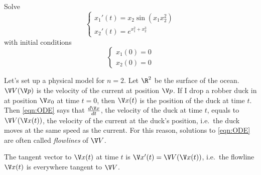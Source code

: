 \documentclass[a4paper]{article}
\theoremstyle{definition}
\begin{document}
\begin{eg}
  Solve
  \[
    \begin{cases}
      x_1'(t) = x_2 \sin(x_1x_2^2) \\
      x_2'(t) = e^{x_1^2 + x_2^3}
    \end{cases}
  \]
  with initial conditions
  \[
    \begin{cases}
      x_1(0) = 0 \\
      x_2(0) = 0
    \end{cases}
  \]
\end{eg}

Let's set up a physical model for \(n = 2\). Let \(\R^2\) be the surface of the ocean. \(\V V(\V p)\) is the velocity of the current at position \(\V p\). If I drop a robber duck in at position \(\V x_0\) at time \(t = 0\), then \(\V x(t)\) is the position of the duck at time \(t\). Then \eqref{eqn:ODE} says that \(\frac{d\V x}{dt}\), the velocity of the duck at time \(t\), equals to \(\V V(\V x(t))\), the velocity of the current at the duck's position, i.e.\ the duck moves at the same speed as the current. For this reason, solutions to \eqref{eqn:ODE} are often called \emph{flowlines} of \(\V V\).

The tangent vector to \(\V x(t)\) at time \(t\) is \(\V x'(t) = \V V(\V x(t))\), i.e.\ the flowline \(\V x(t)\) is everywhere tangent to \(\V V\).
\end{document}
